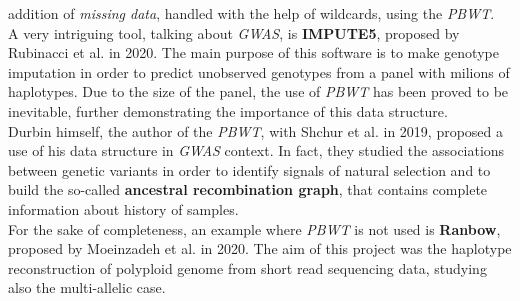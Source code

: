 \documentclass[a4paper,11pt, oneside]{article}
\begin{document}
addition of \textit{missing data}, handled with the help of wildcards, using the
\textit{PBWT}. \\ 
A very intriguing tool, talking about \textit{GWAS}, is
\textbf{IMPUTE5}, proposed by Rubinacci et al. in 2020. The main purpose of this
software is to make genotype imputation in order to predict unobserved genotypes
from a panel with milions of haplotypes. Due to the size of the panel, the use
of \textit{PBWT} has been proved to be inevitable, further demonstrating the
importance of this data structure.\\
Durbin himself, the author of the \textit{PBWT}, with Shchur et al. in 2019,
proposed a use of his data structure in \textit{GWAS} context. In fact, they
studied the associations between genetic variants in order to identify signals
of natural selection and to build the so-called \textbf{ancestral recombination
  graph}, that contains complete information about history of samples.\\
For the sake of completeness, an example where \textit{PBWT} is not used is
\textbf{Ranbow}, proposed by Moeinzadeh et al. in 2020. The 
aim of this project was the haplotype reconstruction of polyploid genome from
short read sequencing data, studying also the multi-allelic case.
\end{document}
